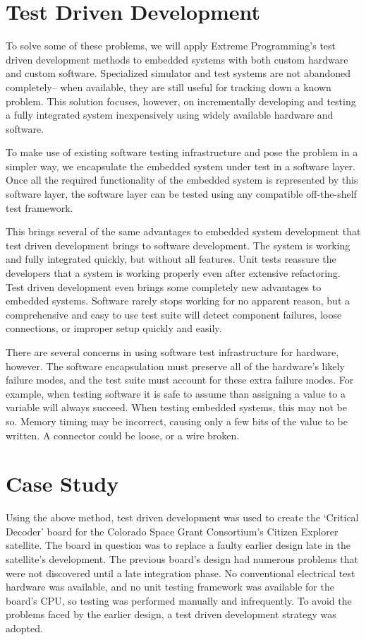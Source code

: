 \documentclass[letterpaper,twocolumn]{article}
\begin{document}
\section{Test Driven Development}

To solve some of these problems, we will apply Extreme Programming's test driven development methods
to embedded systems with both custom hardware and custom software. Specialized simulator and
test systems are not abandoned completely-- when available, they are still useful for tracking down
a known problem. This solution focuses, however, on incrementally developing and testing a fully
integrated system inexpensively using widely available hardware and software.

To make use of existing software testing infrastructure and pose the problem in a simpler way,
we encapsulate the embedded system under test in a software layer. Once all the required
functionality of the embedded system is represented by this software layer, the software layer
can be tested using any compatible off-the-shelf test framework.

This brings several of the same advantages to embedded system development that test driven development
brings to software development. The system is working and fully integrated quickly, but without all
features. Unit tests reassure the developers that a system is working properly even after extensive
refactoring. Test driven development even brings some completely new advantages to embedded
systems. Software rarely stops working for no apparent reason, but a comprehensive and easy to use
test suite will detect component failures, loose connections, or improper setup quickly and easily.

There are several concerns in using software test infrastructure for hardware, however. The software
encapsulation must preserve all of the hardware's likely failure modes, and the test suite must
account for these extra failure modes. For example, when testing software it is safe to assume
than assigning a value to a variable will always succeed. When testing embedded systems, this
may not be so. Memory timing may be incorrect, causing only a few bits of the value to be written.
A connector could be loose, or a wire broken.

\section{Case Study}

Using the above method, test driven development was used to create the `Critical Decoder' board for
the Colorado Space Grant Consortium's Citizen Explorer satellite. The board in question was to replace
a faulty earlier design late in the satellite's development. The previous board's design had numerous
problems that were not discovered until a late integration phase. No conventional electrical test hardware
was available, and no unit testing framework was available for the board's CPU, so testing was performed
manually and infrequently. To avoid the problems faced by the earlier design, a test driven development
strategy was adopted.
\end{document}
